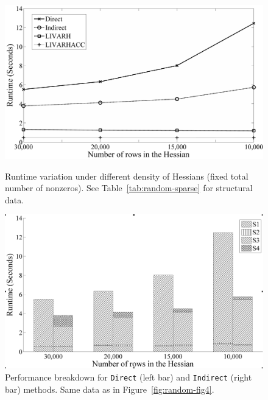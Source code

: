 \documentclass[12pt]{article}
\begin{document}
{\begin{figure}[htbp]
\centering
\begin{minipage}[b]{0.48\linewidth}
\includegraphics[width=1\textwidth]{figures/HRfig4BW}
\caption[Runtime Variation Under Different Density of Hessians]
{Runtime variation under different density of Hessians (fixed total number of nonzeros). See Table~\ref{tab:random-sparse} for structural data.}
\label{fig:random-fig4}
\end{minipage}
\quad
\begin{minipage}[b]{0.48\linewidth}
\includegraphics[width=1\textwidth]{figures/HRfig5BW}
\caption[Performance Breakdown for {\tt Direct} and {\tt Indirect} under 
Varying Density of Hessians]
{Performance breakdown for {\tt Direct} (left bar) and {\tt Indirect} (right bar) methods. Same data as in Figure~\ref{fig:random-fig4}.}
\label{fig:random-fig5}
\end{minipage}
\end{figure}

}
\end{document}
